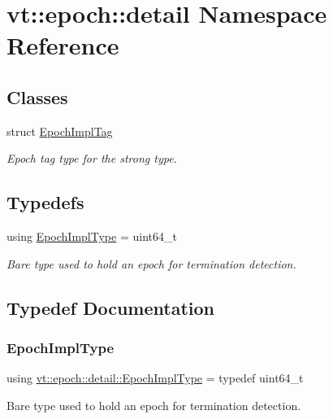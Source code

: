 \hypertarget{namespacevt_1_1epoch_1_1detail}{}\section{vt\+:\+:epoch\+:\+:detail Namespace Reference}
\label{namespacevt_1_1epoch_1_1detail}
\subsection*{Classes}
\begin{DoxyCompactItemize}
\item 
struct \hyperlink{structvt_1_1epoch_1_1detail_1_1_epoch_impl_tag}{Epoch\+Impl\+Tag}
\begin{DoxyCompactList}\small\item\em Epoch tag type for the strong type. \end{DoxyCompactList}\end{DoxyCompactItemize}
\subsection*{Typedefs}
\begin{DoxyCompactItemize}
\item 
using \hyperlink{namespacevt_1_1epoch_1_1detail_a9adc5df96a521e516dc20511eb553075}{Epoch\+Impl\+Type} = uint64\+\_\+t
\begin{DoxyCompactList}\small\item\em Bare type used to hold an epoch for termination detection. \end{DoxyCompactList}\end{DoxyCompactItemize}


\subsection{Typedef Documentation}
\mbox{\label{namespacevt_1_1epoch_1_1detail_a9adc5df96a521e516dc20511eb553075}} 
\subsubsection{\texorpdfstring{Epoch\+Impl\+Type}{EpochImplType}}
{\footnotesize\ttfamily using \hyperlink{namespacevt_1_1epoch_1_1detail_a9adc5df96a521e516dc20511eb553075}{vt\+::epoch\+::detail\+::\+Epoch\+Impl\+Type} = typedef uint64\+\_\+t}



Bare type used to hold an epoch for termination detection. 

